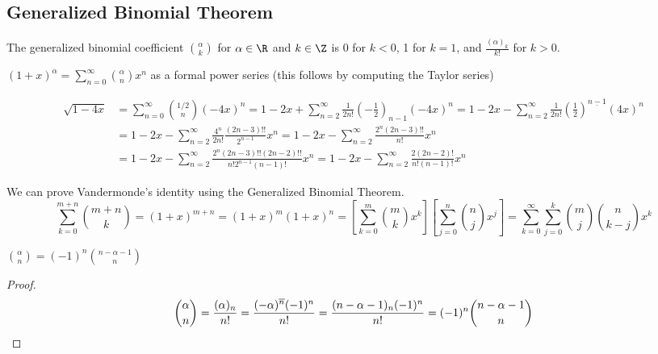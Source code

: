 \documentclass[a4paper]{article}
\begin{document}
\subsection{Generalized Binomial Theorem}

\begin{definition}
The generalized binomial coefficient $\binom\alpha k$ for $\alpha\in\R$ and $k\in\Z$ is 0 for $k<0$, 1 for $k=1$, and $\frac{(\alpha)_k}{k!}$ for $k>0$.
\end{definition}

\begin{theorem}
$(1+x)^\alpha=\sum_{n=0}^\infty\binom\alpha nx^n$ as a formal power series (this follows by computing the Taylor series)
\end{theorem}

\begin{example}
\begin{align*}
\sqrt{1-4x}
&= \sum_{n=0}^\infty\binom{1/2}n(-4x)^n
= 1-2x+\sum_{n=2}^\infty\frac1{2n!}\left(-\frac12\right)_{n-1}(-4x)^n
= 1-2x-\sum_{n=2}^\infty\frac1{2n!}\left(\frac12\right)^{\underline{n-1}}(4x)^n\\
&= 1-2x-\sum_{n=2}^\infty\frac{4^n}{2n!}\frac{(2n-3)!!}{2^{n-1}}x^n
= 1-2x-\sum_{n=2}^\infty\frac{2^n(2n-3)!!}{n!}x^n\\
&= 1-2x-\sum_{n=2}^\infty\frac{2^n(2n-3)!!(2n-2)!!}{n!2^{n-1}(n-1)!}x^n
= 1-2x-\sum_{n=2}^\infty\frac{2(2n-2)!}{n!(n-1)!}x^n
\end{align*}
\end{example}

\begin{example}
We can prove Vandermonde's identity using the Generalized Binomial Theorem.
\begin{equation*}
\sum_{k=0}^{m+n}\binom{m+n}k=(1+x)^{m+n}=(1+x)^m(1+x)^n=\left[\sum_{k=0}^m\binom mkx^k\right]\left[\sum_{j=0}^n\binom njx^j\right]=\sum_{k=0}^\infty\sum_{j=0}^k\binom mj\binom n{k-j}x^k
\end{equation*}
\end{example}

\begin{theorem}\label{alt_binom}
$\displaystyle\binom \alpha n=(-1)^n\binom{n-\alpha-1}n$

\begin{hl}
\begin{proof}
\begin{equation*}
\binom\alpha n
=\frac{(\alpha)_n}{n!}
=\frac{(-\alpha)^{\overline n}(-1)^n}{n!}
=\frac{(n-\alpha-1)_n(-1)^n}{n!}
=(-1)^n\binom{n-\alpha-1}n\qedhere
\end{equation*}
\end{proof}
\end{hl}
\end{theorem}
\end{document}
